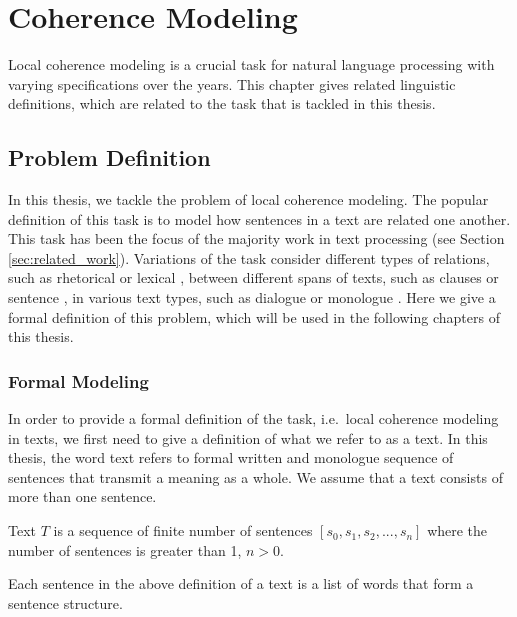 
\chapter{Coherence Modeling}
\label{ch:coherence}

Local coherence modeling is a crucial task for natural language processing with varying specifications over the years. 
This chapter gives related linguistic definitions, which are related to the task that is tackled in this thesis. 


\section{Problem Definition}
\label{sec:coh-def}

In this thesis, we tackle the problem of local coherence modeling. 
The popular definition of this task is to model how sentences in a text are related one another. 
This task has been the focus of the majority work in text processing (see Section \ref{sec:related_work}). 
Variations of the task consider different types of relations, such as rhetorical \cite{hovyeduard89} or lexical \cite{morris91}, between different spans of texts, such as clauses \cite{strube.col98} or sentence \cite{halliday76}, in various text types, such as dialogue \cite{wangxinhao13} or monologue \cite{barzilay08}. 
Here we give a formal definition of this problem, which will be used in the following chapters of this thesis. 

\subsection{Formal Modeling}

In order to provide a formal definition of the task, i.e.\ local coherence modeling in texts, we first need to give a definition of what we refer to as a text. 
In this thesis, the word text refers to formal written and monologue sequence of sentences that transmit a meaning as a whole.  
We assume that a text consists of more than one sentence. 

\begin{definition}
Text $T$ is a sequence of finite number of sentences $[s_0, s_1, s_2, ..., s_n]$ where the number of sentences is greater than 1, $n>0$.   
\end{definition}

Each sentence in the above definition of a text is a list of words that form a sentence structure. 

